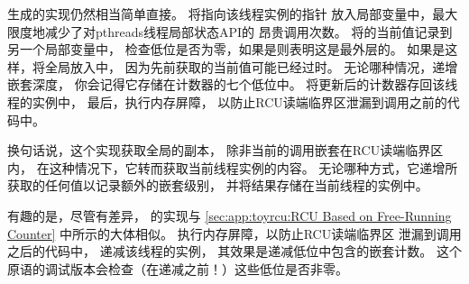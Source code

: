 \begin{listing}

\caption{使用自由运行计数器的可嵌套RCU数据}
\label{lst:app:toyrcu:Data for Nestable RCU Using a Free-Running Counter}
\end{listing}

\begin{listing}
\vspace*{-11pt}
\caption{使用自由运行计数器的可嵌套RCU}
\label{lst:app:toyrcu:Nestable RCU Using a Free-Running Counter}
\end{listing}

\begin{fcvref}
生成的实现仍然相当简单直接。
将指向该线程实例的指针
放入局部变量中，最大限度地减少了对pthreads线程局部状态API的
昂贵调用次数\@。
将的当前值记录到另一个局部变量中，
检查低位是否为零，如果是则表明这是最外层的。
如果是这样，将全局放入中，
因为先前获取的当前值可能已经过时。
无论哪种情况，递增嵌套深度，
你会记得它存储在计数器的七个低位中。
将更新后的计数器存回该线程的实例中，
最后，执行内存屏障，
以防止RCU读端临界区泄漏到调用之前的代码中。
\end{fcvref}

换句话说，这个实现获取全局的副本，
除非当前的调用嵌套在RCU读端临界区内，
在这种情况下，它转而获取当前线程实例的内容。
无论哪种方式，它递增所获取的任何值以记录额外的嵌套级别，
并将结果存储在当前线程的实例中。

\begin{fcvref}
有趣的是，尽管有差异，
的实现与
\cref{sec:app:toyrcu:RCU Based on Free-Running Counter}
中所示的大体相似。
执行内存屏障，以防止RCU读端临界区
泄漏到调用之后的代码中，
递减该线程的实例，
其效果是递减低位中包含的嵌套计数。
这个原语的调试版本会检查（在递减之前！\@）这些低位是否非零。
\end{fcvref}


